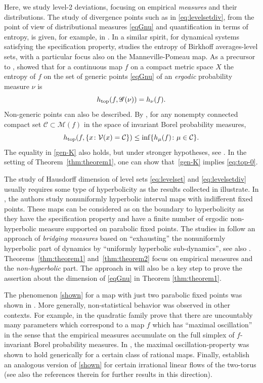 \documentclass[english, 10pt]{amsart}
\numberwithin{equation}{section}
\theoremstyle{definition}
\theoremstyle{plain}
\theoremstyle{plain}
\theoremstyle{definition}
\theoremstyle{definition}
\theoremstyle{plain}
\theoremstyle{definition}
\newcommand{\cV}{{\mathcal V}}
\newcommand{\cM}{{\mathcal M}}
\newcommand{\sG}{\mathscr{G}}
\numberwithin{equation}{section}
\begin{document}
Here, we study level-2 deviations, focusing on empirical \emph{measures} and their distributions.  The study of divergence points such as in \eqref{eq:levelsetdiv}, from the point of view of distributional measures \eqref{eqGnu} and quantification in terms of entropy, is given, for example, in \cite{ErcKueLin:05}. In a similar spirit, for dynamical systems satisfying the specification property, \cite{TakVer:03} studies the entropy of Birkhoff averages-level sets, with a particular focus also on the Manneville-Pomeau map.  As a precursor to \cite{TakVer:03,ErcKueLin:05},  \cite{Bow:73} showed that for a continuous map $f$ on a compact metric space $X$ the entropy of $f$ on the set of generic points \eqref{eqGnu} of an \emph{ergodic} probability measure $\nu$ is 
\[
	h_{\rm top}(f,\sG(\nu))
	= h_\nu(f).
\]
Non-generic points can also be described. 
By \cite[Theorem 4.1]{PfiSul:07}, for any nonempty connected compact set $\mathcal{C}\subset\cM(f)$ in the space of invariant Borel probability measures,
\begin{equation}\label{gen-K}
	h_{\rm top}(f,\{x\colon \cV(x)=\mathcal{C}\})\le \inf\{h_\mu(f)\colon\mu\in \mathcal{C}\}.
\end{equation}
The equality in \eqref{gen-K} also holds, but under stronger hypotheses, see \cite{PfiSul:07}. 
In the setting of Theorem~\ref{thm:theorem1}, one can show that~\eqref{gen-K} implies \eqref{eq:top-0}.

The study of Hausdorff dimension of level sets \eqref{eq:levelset} and \eqref{eq:levelsetdiv} usually requires some type of hyperbolicity as the results collected in \cite{BarPesSch:97} illustrate. In  \cite{GelRam:09,JohJorObePol:10}, the authors study  nonuniformly hyperbolic interval maps with indifferent fixed points. These maps can be considered as on the boundary to hyperbolicity as they have the specification property and have a finite number of ergodic non-hyperbolic measure supported on parabolic fixed points.  The studies in \cite{GelRam:09,JohJorObePol:10} follow an approach of \emph{bridging measures} based on ``exhausting'' the nonuniformly hyperbolic part of dynamics by ``uniformly hyperbolic sub-dynamics'', see also \cite{BarSch:00}. Theorems~\ref{thm:theorem1} and~\ref{thm:theorem2} focus on empirical measures and the \emph{non-hyperbolic} part. The approach in \cite{GelRam:09} will also be a key step to prove the assertion about the dimension of \eqref{eqGnu} in Theorem \ref{thm:theorem1}.

The phenomenon \eqref{shown} for a map with just two parabolic fixed points was shown in \cite{AarThaZwe:05,CoaLuz:24,BarCha:}. More generally, non-statistical behavior was observed in other contexts. For example, in the quadratic family \cite{HofKel:95} prove that there are uncountably many parameters which correspond to a map $f$ which has ``maximal oscillation'' in the sense that the empirical measures accumulate on the full simplex of $f$-invariant Borel probability measures. In \cite{Tal:22}, the maximal oscillation-property was shown to hold generically for a certain class of rational maps. Finally, \cite{AndGui:22} establish an analogous version of \eqref{shown} for certain irrational linear flows of the two-torus (see also the references therein for further results in this direction).
\end{document}
